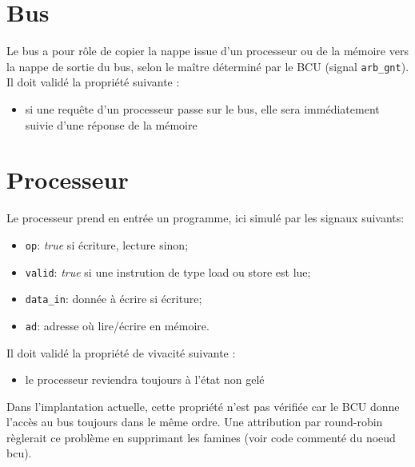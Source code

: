 \documentclass[a4paper, 11pt]{article}
\begin{document}
\section{Bus}
Le bus a pour rôle de copier la nappe issue d'un processeur ou de la mémoire
vers la nappe de sortie du bus, selon le maître déterminé par le BCU (signal
\texttt{arb\_gnt}). Il doit validé la propriété suivante :
\begin{itemize}
  \item si une requête d'un processeur passe sur le bus, elle sera immédiatement
    suivie d'une réponse de la mémoire
\end{itemize}

\section{Processeur}
Le processeur prend en entrée un programme, ici simulé par les signaux suivants:
\begin{itemize}
  \item \texttt{op}: \textit{true} si écriture, lecture sinon;
  \item \texttt{valid}: \textit{true} si une instrution de type load ou store 
    est lue;
  \item \texttt{data\_in}: donnée à écrire si écriture;
  \item \texttt{ad}: adresse où lire/écrire en mémoire.
\end{itemize}
Il doit validé la propriété de vivacité suivante :
\begin{itemize}
  \item le processeur reviendra toujours à l'état non gelé
\end{itemize}
Dans l'implantation actuelle, cette propriété n'est pas vérifiée car le BCU
donne l'accès au bus toujours dans le même ordre. Une attribution par 
round-robin règlerait ce problème en supprimant les famines (voir code 
commenté du noeud bcu).
\end{document}
